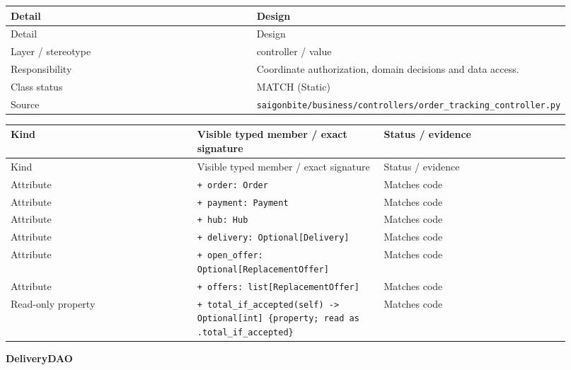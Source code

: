 \begin{longtable}{>{\raggedright\arraybackslash}p{0.4600\linewidth}>{\raggedright\arraybackslash}p{0.4600\linewidth}}
Detail & Design \\
\hline\endfirsthead
Detail & Design \\
\hline\endhead
Layer / stereotype & controller / \guillemotleft{}value\guillemotright{} \\
Responsibility & Coordinate authorization, domain decisions and data access. \\
Class status & MATCH (Static) \\
Source & \texttt{saigonbite/\allowbreak{}business/\allowbreak{}controllers/\allowbreak{}order\_\allowbreak{}tracking\_\allowbreak{}controller.\allowbreak{}py} \\
\end{longtable}
\begin{longtable}{>{\raggedright\arraybackslash}p{0.3067\linewidth}>{\raggedright\arraybackslash}p{0.3067\linewidth}>{\raggedright\arraybackslash}p{0.3067\linewidth}}
Kind & Visible typed member / exact signature & Status / evidence \\
\hline\endfirsthead
Kind & Visible typed member / exact signature & Status / evidence \\
\hline\endhead
Attribute & \texttt{+ order: Order} & Matches code \\
Attribute & \texttt{+ payment: Payment} & Matches code \\
Attribute & \texttt{+ hub: Hub} & Matches code \\
Attribute & \texttt{+ delivery: Optional[Delivery]} & Matches code \\
Attribute & \texttt{+ open\_\allowbreak{}offer: Optional[ReplacementOffer]} & Matches code \\
Attribute & \texttt{+ offers: list[ReplacementOffer]} & Matches code \\
Read-only property & \texttt{+ total\_\allowbreak{}if\_\allowbreak{}accepted(self) -\textgreater{} Optional[int] \{property; read as .\allowbreak{}total\_\allowbreak{}if\_\allowbreak{}accepted\}} & Matches code \\
\end{longtable}
\textbf{DeliveryDAO}

